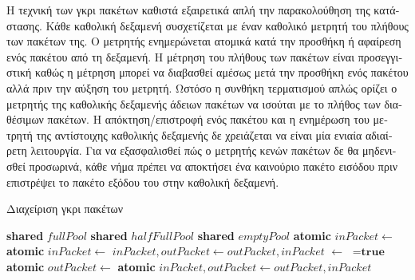\begin{greek}
Η τεχνική των γκρι πακέτων καθιστά εξαιρετικά απλή την
παρακολούθηση της κατάστασης. Κάθε καθολική δεξαμενή συσχετίζεται
με έναν καθολικό μετρητή του πλήθους των πακέτων της. Ο μετρητής
ενημερώνεται ατομικά κατά την προσθήκη ή αφαίρεση ενός
πακέτου από τη δεξαμενή. Η μέτρηση του πλήθους των πακέτων
είναι προσεγγιστική καθώς η μέτρηση μπορεί να διαβασθεί
αμέσως μετά την προσθήκη ενός πακέτου αλλά πριν την αύξηση
του μετρητή. Ωστόσο η συνθήκη τερματισμού απλώς ορίζει
ο μετρητής της καθολικής δεξαμενής άδειων πακέτων να ισούται
με το πλήθος των διαθέσιμων πακέτων. Η απόκτηση/επιστροφή
ενός πακέτου και η ενημέρωση του μετρητή της αντίστοιχης
καθολικής δεξαμενής δε χρειάζεται να είναι μία ενιαία
αδιαίρετη λειτουργία. Για να εξασφαλισθεί πώς ο μετρητής
κενών πακέτων δε θα μηδενισθεί προσωρινά, κάθε νήμα πρέπει
να αποκτήσει ένα καινούριο πακέτο εισόδου πριν επιστρέψει
το πακέτο εξόδου του στην καθολική δεξαμενή. 

\begin{algorithm}
  \caption{Διαχείριση γκρι πακέτων}
  \label{alg:par_5}
  \begin{algorithmic}[1]
    \State \textbf{shared} $fullPool$ 
    \State \textbf{shared} $halfFullPool$ 
    \State \textbf{shared} $emptyPool$ 
    \Statex
      \State \textbf{atomic}
      \State $inPacket \gets$ 
        \State \textbf{atomic}
        \State $inPacket \gets$ 
      \EndIf
        \State $inPacket, outPacket \gets outPacket, inPacket$
      \EndIf
      \State {}
    \EndFunction
    \Statex
        \State {} $\gets$  $=\textbf{true}$ 
      \EndFor
    \EndProcedure
    \Statex
        \State {}
      \EndIf
        \State \textbf{atomic}
        \State $outPacket \gets$ 
      \EndIf
        \State \textbf{atomic}
        \State {}
      \EndIf
          \State $inPacket, outPacket \gets outPacket, inPacket$
          \State \Return{\null}
        \EndIf  
      \EndIf
    \EndProcedure
    \Statex
      \State {}
        \State {}
      \Else
        \State {}
      \EndIf
    \EndProcedure
  \end{algorithmic}
\end{algorithm}


\end{greek}
